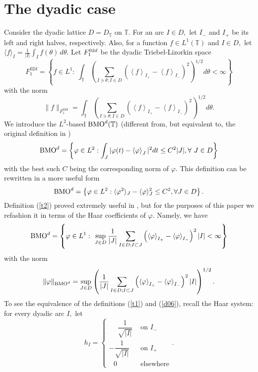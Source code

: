 \documentclass[psamsfonts]{conm-p-l}
\theoremstyle{definition}
\theoremstyle{remark}
\numberwithin{equation}{section}
\begin{document}
\section{The dyadic case} 
Consider the dyadic lattice $D=D_\mathbb{T}$ on $\mathbb{T}.$ For an arc $I\in D,$ let $I_-$ and $I_+$ be its left and right halves, respectively. Also, for a function $f\in L^1(\mathbb{T})$ and $I\in D,$ let $\langle f\rangle_I=\frac1{|I|}\int_If(\theta)\,d\theta.$  Let ${\displaystyle}{F^{02d}_1}$ be the dyadic Triebel-Lizorkin space
{\begin{equation}\label{d08}{
{F^{02d}_1}=\left\{f\in L^1:~\int_\mathbb{T}\left(\sum_{I\ni \theta;I\in D}\left(\left<f\right>_{I_+}-\left<f\right>_{I_-}\right)^2\right)^{1/2}d\theta<\infty \right\}
}\end{equation}} 
with the norm
$$
\|f\|_{F^{02d}_1}=\int_\mathbb{T}\left(\sum_{I\ni \theta;I\in D}\left(\left<f\right>_{I_+}-\left<f\right>_{I_-}\right)^2\right)^{1/2}d\theta.
$$
We introduce the $L^2\!\!$-based ${{\rm{BMO}}}^d(\mathbb{T})$ (different from, but equivalent to, the original definition in \cite{jn})
{\begin{equation}\label{t1}{
{{\rm{BMO}}}^d=\left\{\varphi\in L^2: \int_J|\varphi(t)-\left<\varphi\right>_J|^2dt\le C^2|J|, \forall~J\in D\right\}
}\end{equation}}
with the best such $C$ being the corresponding norm of $\varphi.$ This definition can be rewritten in a more useful form
{\begin{equation}\label{t2}{
{{\rm{BMO}}}^d=\left\{\varphi\in L^2: \langle\varphi^2\rangle_J-\langle\varphi\rangle^2_J\le C^2, \forall J\in D\right\}.
}\end{equation}}
Definition (\ref{t2}) proved extremely useful in \cite{sv}, but for the purposes of this paper we refashion it in terms of the Haar coefficients of $\varphi.$ Namely, we have
{\begin{equation}\label{d06}{
{{\rm{BMO}}}^d=\left\{\varphi\in L^1:
~\sup_{J\in D}\frac1{|J|}\sum_{I\in D;I\subset J}\left(\left<\varphi\right>_{I_+}-\left<\varphi\right>_{I_-}\right)^2|I|<\infty\right\}
}\end{equation}} 
with the norm
$$
\| \varphi\|_{{{\rm{BMO}}}^d}=\sup_{J\in D}\left(\frac1{|J|}\sum_{I\in D;I\subset J}\left(\left<\varphi\right>_{I_+}-\left<\varphi\right>_{I_-}\right)^2|I|\right)^{1/2}.
$$
To see the equivalence of the definitions (\ref{t1}) and (\ref{d06}), recall the Haar system: for every dyadic arc $I,$ let
$$
h_I=\left\{
\begin{array}{ll}
\phantom{-}\dfrac1{\sqrt{|I|}}&\text{ on }I_-\\
-\dfrac1{\sqrt{|I|}}&\text{ on }I_+\\
~~~0&\text{ elsewhere}
\end{array}.\right.
$$
\end{document}
